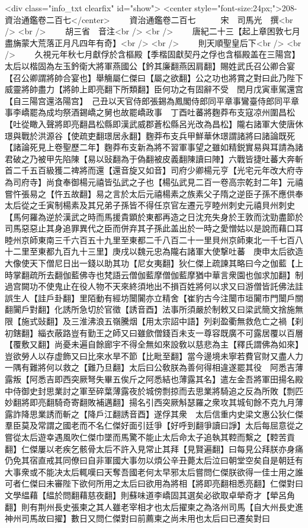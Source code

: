 <div class="info_txt clearfix" id="show">
<center style="font-size:24px;">208-資治通鑑卷二百七</center>
  　　資治通鑑卷二百七　　　宋　司馬光　撰<br />
<br />
　　胡三省　音注<br />
<br />
　　唐紀二十三【起上章困敦七月盡㫋蒙大荒落正月凡四年有奇】<br />
<br />
　　則天順聖皇后下<br />
<br />
　　久視元年秋七月獻俘於含樞殿【季楷固獻契丹之俘也含樞殿盖在三陽宫】太后以楷固為左玉鈐衛大將軍燕國公【鈐其廉翻燕因肩翻】賜姓武氏召公卿合宴【召公卿謂將帥合宴也】舉觴屬仁傑曰【屬之欲翻】公之功也將賞之對曰此乃陛下威靈將帥盡力【將帥上即亮翻下所類翻】臣何功之有固辭不受　閏月戊寅車駕還宫【自三陽宫還洛陽宫】　己丑以天官侍郎張錫為鳳閣侍郎同平章事鸞臺侍郎同平章事李嶠罷為成均祭酒錫嶠之舅也故罷嶠政事　丁酉吐蕃將麴莽布支寇凉州圍昌松【吐從瞰入聲將即亮翻昌松縣即漢武威郡蒼松縣呂光改為昌松】隴右諸軍大使唐休璟與戰於洪源谷【使疏吏翻璟居永翻】麴莽布支兵甲鮮華休璟謂諸將曰諸論既死【諸論死見上卷聖歷二年】麴莽布支新為將不習軍事望之雖如精鋭實易與耳請為諸君破之乃被甲先陷陳【易以䜴翻為于偽翻被皮義翻陳讀曰陣】六戰皆捷吐蕃大奔斬首二千五百級獲二禆將而還【還音旋又如音】司府少卿楊元亨【光宅元年改大府寺為司府寺】尚食奉御楊元禧皆弘武之子也【楊弘武見二百一卷高宗乾封二年】元禧嘗忤張易之【忤五故翻】易之言於太后元禧楊素之族素父子隋之逆臣子孫不應供奉太后從之壬寅制楊素及其兄弟子孫皆不得任京官左遷元亨睦州刺史元禧貝州刺史【馬何羅為逆於漢武之時而馬援貴顕於東都再造之日沈充失身於王敦而沈勁盡節於司馬惡惡止其身追罪異代之臣而併弃其子孫此盖出於一時之愛憎姑以是說而藉口耳睦州京師東南三千六百五十九里至東都二千八百二十一里貝州京師東北一千七百八十二里至東都九百九十三里】庚戌以魏元忠為隴右諸軍大使撃吐蕃　庚申太后欲造大像使天下僧尼日出一錢以助其功【尼女夷翻】狄仁傑上疏諫其略曰今之伽藍【上時掌翻疏所去翻伽藍佛寺也梵語云僧伽藍摩僧伽藍摩猶中華言衆園也伽求加翻】制過宫闕功不使鬼止在役人物不天來終須地出不損百姓將何以求又曰游僧皆託佛法詿誤生人【詿戶卦翻】里陌動有經坊闤闠亦立精舍【崔豹古今注闤市垣闠市門闤戶關翻闠戶對翻】化誘所急切於官徵【誘音酉】法事所須嚴於制敕又曰梁武簡文捨施無限【施式䜴翻】及三淮沸浪五嶺騰烟【用太宗詔中語】列刹盈衢無救危亡之禍【刹初鎋翻】緇衣蔽路豈有勤王之師又曰雖歛僧錢百未支一尊容既廣不可露居覆以百層【覆敷又翻】尚憂未遍自餘廊宇不得全無如來設敎以慈悲為主【釋氏謂佛為如來】豈欲勞人以存虚飾又曰比來水旱不節【比毗至翻】當今邊境未寧若費官財又盡人力一隅有難將何以救之【難乃旦翻】太后曰公敎朕為善何得相違遂罷其役　阿悉吉薄露叛【阿悉吉即西突厥弩失畢五俟斤之阿悉結也薄露其名】遣左金吾將軍田揚名殿中侍御史封思業討之軍至碎葉薄露夜於城傍剽掠而去思業將騎追之反為所敗【剽匹妙翻將即亮翻騎奇寄翻敗補邁翻】揚名引西突厥斛瑟羅之衆攻其城旬餘不克九月薄露詐降思業誘而斬之【降戶江翻誘音酉】遂俘其衆　太后信重内史梁文惠公狄仁傑羣臣莫及常謂之國老而不名仁傑好面引廷爭【好呼到翻爭讀曰諍】太后每屈意從之嘗從太后遊幸遇風吹仁傑巾墜而馬驚不能止太后命太子追執其鞚而繫之【鞚苦貢翻】仁傑屢以老疾乞骸骨太后不許入見常止其拜【見賢遍翻】曰每見公拜朕亦身痛仍免其宿直戒其同僚曰自非軍國大事勿以煩公辛丑薨太后泣曰朝堂空矣自是朝廷有大事衆或不能决太后輒嘆曰天奪吾國老何太早邪太后嘗問仁傑朕欲得一佳士用之誰可者仁傑曰未審陛下欲何所用之太后曰欲用為將相【將即亮翻相悉亮翻】仁傑對曰文學緼藉【緼於問翻藉慈夜翻】則蘇味道李嶠固其選矣必欲取卓犖奇才【犖呂角翻】則有荆州長史張柬之其人雖老宰相才也太后擢柬之為洛州司馬【自大州長史進神州司馬故曰擢】數日又問仁傑對曰前薦柬之尚未用也太后曰已遷矣對曰
